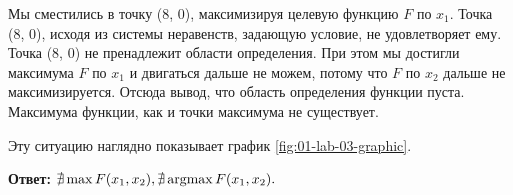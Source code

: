 Мы сместились в точку (8, 0), максимизируя целевую функцию $F$ по $x_1$.
Точка (8, 0), исходя из системы неравенств, задающую условие, не удовлетворяет ему. 
Точка (8, 0) не пренадлежит области определения. При этом мы достигли максимума $F$ по $x_1$ и двигаться дальше не можем,
потому что $F$ по $x_2$ дальше не максимизируется.
Отсюда вывод, что область определения функции пуста. Максимума функции, как и точки максимума не существует.

Эту ситуацию наглядно показывает график \ref{fig:01-lab-03-graphic}.

\textbf{Ответ:} $\nexists\max F(x_1, x_2), \nexists\operatorname*{argmax} F(x_1, x_2).$

\newpage